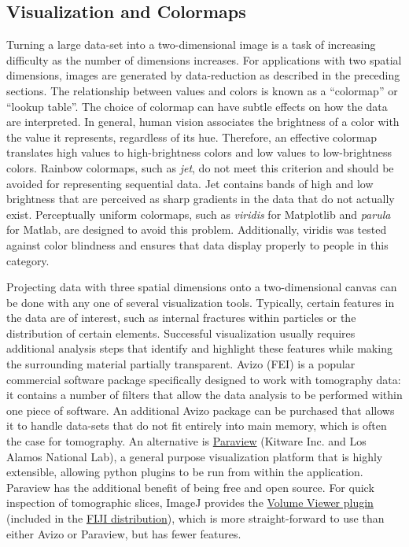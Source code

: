 \documentclass[journal=cmatex,manuscript=perspective]{achemso}
\begin{document}
\subsection{Visualization and Colormaps}

Turning a large data-set into a two-dimensional image is a task of
increasing difficulty as the number of dimensions increases. For
applications with two spatial dimensions, images are generated by
data-reduction as described in the preceding sections. The
relationship between values and colors is known as a ``colormap'' or
``lookup table''. The choice of colormap can have subtle effects on
how the data are interpreted. In general, human vision associates the
brightness of a color with the value it represents, regardless of its
hue. Therefore, an effective colormap translates high values to
high-brightness colors and low values to low-brightness
colors. Rainbow colormaps, such as \emph{jet}, do not meet this
criterion and should be avoided for representing sequential data. Jet
contains bands of high and low brightness that are perceived as sharp
gradients in the data that do not actually exist. Perceptually uniform
colormaps, such as \emph{viridis} for Matplotlib and \emph{parula} for
Matlab, are designed to avoid this problem. Additionally, viridis was
tested against color blindness and ensures that data display properly
to people in this category.

Projecting data with three spatial dimensions onto a two-dimensional
canvas can be done with any one of several visualization
tools. Typically, certain features in the data are of interest, such
as internal fractures within particles or the distribution of certain
elements. Successful visualization usually requires additional
analysis steps that identify and highlight these features while making
the surrounding material partially transparent. Avizo (FEI) is a
popular commercial software package specifically designed to work with
tomography data: it contains a number of filters that allow the data
analysis to be performed within one piece of software. An additional
Avizo package can be purchased that allows it to handle data-sets that
do not fit entirely into main memory, which is often the case for
tomography. An alternative is
\href{http://www.paraview.org/}{Paraview} (Kitware Inc. and Los Alamos
National Lab), a general purpose visualization platform that is highly
extensible, allowing python plugins to be run from within the
application. Paraview has the additional benefit of being free and
open source. For quick inspection of tomographic slices, ImageJ
provides the
\href{https://imagej.nih.gov/ij/plugins/volume-viewer.html}{Volume
  Viewer plugin} (included in the \href{http://imagej.net/Fiji}{FIJI
  distribution}), which is more straight-forward to use than either
Avizo or Paraview, but has fewer features.
\end{document}
